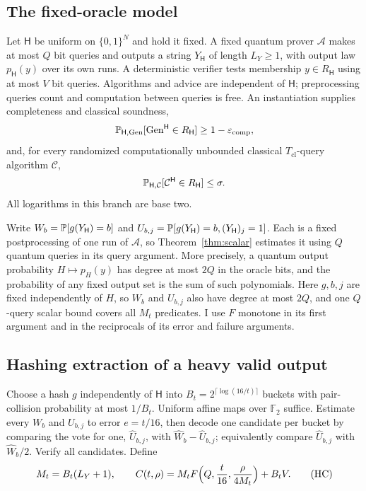 \documentclass[11pt]{article}
\theoremstyle{definition}\newtheorem{definition}[theorem]{Definition}
\theoremstyle{remark}\newtheorem{remark}[theorem]{Remark}
\newcommand{\mc}{\mathcal}\newcommand{\eps}{\varepsilon}
\begin{document}
\subsection{The fixed-oracle model}
Let \(\mathsf H\) be uniform on \(\{0,1\}^N\) and hold it fixed. A fixed quantum prover \(\mc A\) makes at most \(Q\) bit queries and outputs a string \(Y_{\mathsf H}\) of length \(L_Y\ge1\), with output law \(p_{\mathsf H}(y)\) over its own runs. A deterministic verifier tests membership \(y\in R_{\mathsf H}\) using at most \(V\) bit queries. Algorithms and advice are independent of \(\mathsf H\); preprocessing queries count and computation between queries is free. An instantiation supplies completeness and classical soundness,
\[
 \Prb_{\mathsf H,\mathrm{Gen}}[\mathrm{Gen}^{\mathsf H}\in R_{\mathsf H}]\ge1-\eps_{\mathrm{comp}},
\]
and, for every randomized computationally unbounded classical \(T_{\mathrm{cl}}\)-query algorithm \(\mc C\),
\[
 \Prb_{\mathsf H,\mc C}[\mc C^{\mathsf H}\in R_{\mathsf H}]\le\sigma.
\]
All logarithms in this branch are base two.

Write \(W_b=\mathbb P[g(Y_{\mathsf H})=b]\) and \(U_{b,j}=\mathbb P[g(Y_{\mathsf H})=b,(Y_{\mathsf H})_j=1]\). Each is a fixed postprocessing of one run of \(\mc A\), so Theorem~\ref{thm:scalar} estimates it using \(Q\) quantum queries in its query argument. More precisely, a quantum output probability \(H\mapsto p_H(y)\) has degree at most \(2Q\) in the oracle bits, and the probability of any fixed output set is the sum of such polynomials. Here \(g,b,j\) are fixed independently of \(H\), so \(W_b\) and \(U_{b,j}\) also have degree at most \(2Q\), and one \(Q\)-query scalar bound covers all \(M_t\) predicates. I use \(F\) monotone in its first argument and in the reciprocals of its error and failure arguments.

\subsection{Hashing extraction of a heavy valid output}
Choose a hash \(g\) independently of \(\mathsf H\) into \(B_t=2^{\lceil\log(16/t)\rceil}\) buckets with pair-collision probability at most \(1/B_t\). Uniform affine maps over \(\mathbb F_2\) suffice. Estimate every \(W_b\) and \(U_{b,j}\) to error \(e=t/16\), then decode one candidate per bucket by comparing the vote for one, \(\widehat U_{b,j}\), with \(\widehat W_b-\widehat U_{b,j}\); equivalently compare \(\widehat U_{b,j}\) with \(\widehat W_b/2\). Verify all candidates. Define
\[
 M_t=B_t(L_Y+1),\qquad
 C(t,\rho)=M_tF\Bigl(Q,\frac t{16},\frac\rho{4M_t}\Bigr)+B_tV.
 \tag{HC}\label{eq:HC}
\]
\end{document}
